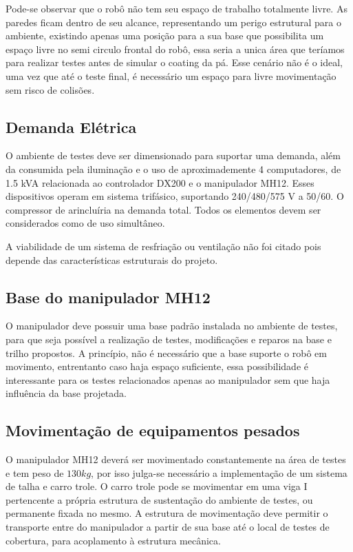 Pode-se observar que o robô não tem seu espaço de trabalho totalmente livre. As
paredes ficam dentro de seu alcance, representando um perigo estrutural
para o ambiente,  existindo apenas uma posição para a sua base que possibilita
um espaço livre no semi circulo frontal do robô, essa seria a unica área que teríamos para realizar testes 
antes de simular o coating da pá. Esse cenário não é o ideal, uma vez que até o teste final, 
é necessário um espaço para livre movimentação sem risco de colisões. 

\subsection{Demanda Elétrica}

O ambiente de testes deve ser dimensionado para suportar uma demanda, além da
consumida pela iluminação e o uso de aproximademente 4 computadores, de 1.5 kVA
relacionada ao controlador DX200 e o manipulador MH12. 
Esses dispositivos operam em sistema trifásico, suportando 240/480/575 V a 50/60. 
O compressor de arincluíria %
na demanda total.
Todos os elementos devem ser considerados como de uso
simultâneo. 

A viabilidade de um sistema de resfriação ou ventilação não foi citado pois
depende das características estruturais do projeto. 

\subsection{Base do manipulador MH12}
O manipulador deve possuir uma base padrão instalada no ambiente de testes, para
que seja possível a realização de testes, modificações e reparos na base e
trilho propostos. 
A princípio, não é necessário que a base suporte o robô em
movimento, entrentanto caso haja espaço suficiente, essa possibilidade é
interessante para os testes relacionados apenas ao manipulador sem que haja
influência da base projetada.


\subsection{Movimentação de equipamentos pesados}
O manipulador MH12 deverá ser movimentado constantemente na área de testes e tem
peso de $130kg$, por isso julga-se necessário a implementação de um sistema de
talha e carro trole. O carro trole pode se movimentar em uma viga I pertencente
a própria estrutura de sustentação do ambiente de testes, ou permanente fixada
no mesmo. A estrutura de movimentação deve permitir o transporte entre do
manipulador a partir de sua base até o local de testes de cobertura, para
acoplamento à estrutura mecânica.



